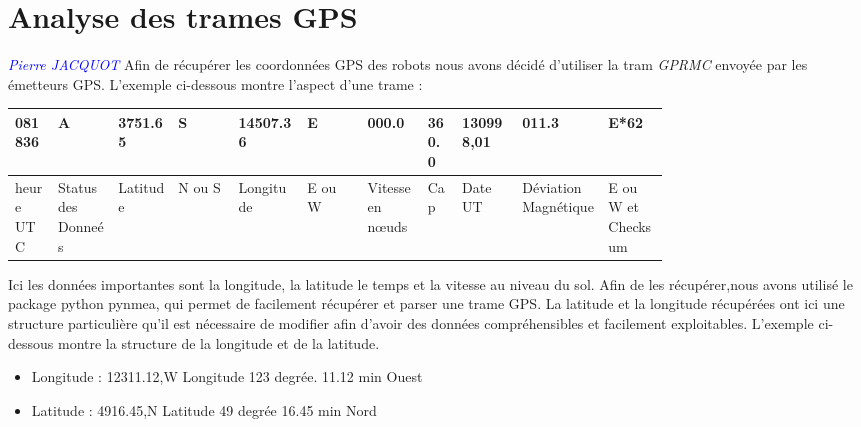 \documentclass[10pt,a4paper]{report}
\begin{document}
\section{Analyse des trames GPS}
\textcolor{blue}{\textit{Pierre JACQUOT}}
Afin de récupérer les coordonnées GPS des robots nous avons décidé d'utiliser la tram \textit{GPRMC} envoyée par les émetteurs GPS. L'exemple ci-dessous montre l'aspect d'une trame : \newline
\begin{center}
\begin{tabular}{|m{0.05\linewidth}|m{0.07\linewidth}|m{0.07\linewidth}|m{0.07\linewidth}|m{0.08\linewidth}|m{0.07\linewidth}|m{0.07\linewidth}|m{0.04\linewidth}|m{0.07\linewidth}|m{0.1\linewidth}|m{0.07\linewidth}|}
\hline
    081836 & A & 3751.65 & S & 14507.36 & E & 000.0 & 360.0 & 130998,01 & 011.3 & E*62  \\ \hline
    heure UTC & Status des Donneés & Latitude & N ou S & Longitude & E ou W & Vitesse en nœuds & Cap & Date UT & Déviation Magnétique & E ou W et Checksum \\ \hline

\end{tabular}
\end{center}
Ici les données importantes sont la longitude, la latitude le temps et la vitesse au niveau du sol. Afin de les récupérer,nous avons utilisé le package python pynmea, qui permet de facilement récupérer et parser une trame GPS. \newline
La latitude et la longitude récupérées ont ici une structure particulière qu'il est nécessaire de modifier afin d'avoir des données compréhensibles et facilement exploitables. L'exemple ci-dessous montre la structure de la longitude et de la latitude. \newline
\begin{itemize}
  \item Longitude  : 12311.12,W   Longitude 123 degrée. 11.12 min Ouest
  \item Latitude : 4916.45,N    Latitude 49 degrée 16.45 min Nord
\end{itemize}
\end{document}
